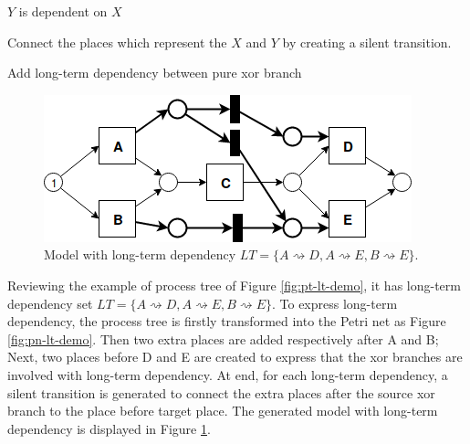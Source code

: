 \begin{algorithm}[!ht]
	\SetAlgoLined
	$Y$ is dependent on $X$\;
	
	Connect the places which represent the $X$ and $Y$ by creating a silent transition.
	\caption{Add long-term dependency between pure xor branch}
	\label{alg: Adding method}
\end{algorithm}
\begin{figure}
	\includegraphics[width=\textwidth]{figures/algorithm/LT_Seq_01_Silent_01.png}
	\caption[Model with long-term dependency]{Model with long-term dependency $LT=\{ A\rightsquigarrow D, A\rightsquigarrow E, B\rightsquigarrow E\}. $ }
	\label{fig:pn-demo-with-lt}
\end{figure}
Reviewing the example of process tree of Figure \ref{fig:pt-lt-demo}, it has long-term dependency set $LT=\{ A\rightsquigarrow D, A\rightsquigarrow E, B\rightsquigarrow E\}$. To express long-term dependency,  the process tree is firstly transformed into the Petri net as Figure \ref{fig:pn-lt-demo}. Then two extra places are added respectively after A and B; Next, two places before D and E are created to express that the xor branches are involved with long-term dependency. At end, for each long-term dependency, a silent transition is generated to connect the extra places after the source xor branch to the place before target place. The generated model with long-term dependency is displayed in Figure \ref{fig:pn-demo-with-lt}.

